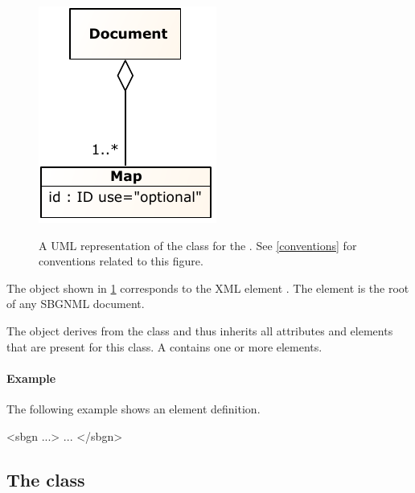 \begin{figure}[ht!]
  \centering
  \includegraphics[scale=1.0]{figures/sbgnml_document_uml.pdf}\\
\caption{A UML representation of the \Document class for the
\SbgnmlPackage. See \ref{conventions} for conventions related to this
figure. }
  \label{fig:sbgnml_document_uml}
\end{figure}

The \Document object shown in \ref{fig:sbgnml_document_uml} corresponds to the XML element .
The  element is the root of any SBGNML document.


The \Document object derives from the \SbgnBase class and thus inherits all attributes and elements that are present for this class.
A \Document contains one or more \Map elements.

\paragraph{Example}

The following example shows an  element definition. 

\begin{example}
<sbgn ...>
    ...
</sbgn>\end{example}


\subsection{The  class}
\label{map-class}


